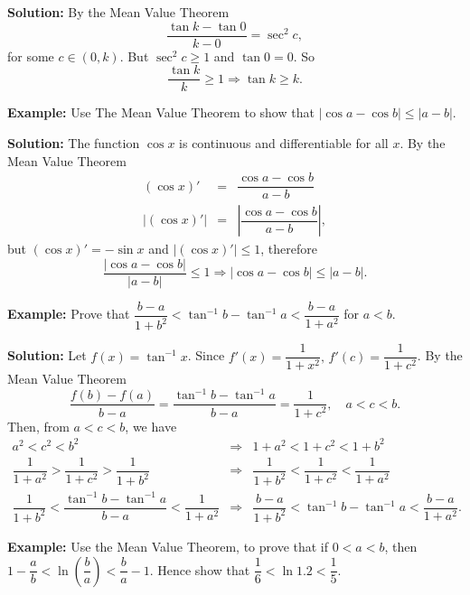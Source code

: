 \documentclass[titlepage,a4paper,12pt]{report}
\begin{document}
\noindent \textbf{Solution:} By the Mean Value Theorem
\begin{equation*}
\dfrac{\tan k -\tan 0}{k-0} =\sec ^2 c,
\end{equation*}
 for some $c\in (0,k)$. But $\sec ^2 c \geq 1$ and $\tan 0 =0$. So 
 \begin{equation*}
 \dfrac{\tan k}{k} \geq 1 \Longrightarrow \tan k \geq k.
 \end{equation*}
 
 \noindent \textbf{Example:} Use The Mean Value Theorem to show that $|\cos a -\cos b|\leq |a-b|$.
 
 \noindent \textbf{Solution:} The function $\cos x$ is continuous and differentiable for all $x$. By the Mean Value Theorem
 \begin{eqnarray*}
 (\cos x)' &=& \dfrac{\cos a -\cos b}{a-b}\\
 |(\cos x)'| &=& \left|\dfrac{\cos a -\cos b}{a-b} \right|,
 \end{eqnarray*}
 but $(\cos x)'=-\sin x$ and $|(\cos x)'|\leq 1$, therefore
 \begin{equation*}
 \dfrac{|\cos a -\cos b|}{|a-b|}\leq 1 \Longrightarrow |\cos a -\cos b|\leq |a-b|.
 \end{equation*}
 
 \noindent \textbf{Example:} Prove that $\dfrac{b-a}{1+b^2}<\tan ^{-1} b -\tan ^{-1} a < \dfrac{b-a}{1+a^2}$ for $a<b$.
 
 \noindent \textbf{Solution:} Let $f(x)=\tan ^{-1} x $. Since $f'(x)=\dfrac{1}{1+x^2}, \,f'(c)=\dfrac{1}{1+c^2} $. By the Mean Value Theorem
 \begin{equation*}
 \dfrac{f(b)-f(a)}{b-a}=\dfrac{\tan ^{-1} b-\tan ^{-1} a}{b-a} =\dfrac{1}{1+c^2}, \quad a<c<b.
 \end{equation*}
 Then, from $a<c<b$, we have 
 \begin{eqnarray*}
 a^2<c^2<b^2 &\Longrightarrow& 1+a^2<1+c^2<1+b^2\\
 \dfrac{1}{1+a^2}>\dfrac{1}{1+c^2}>\dfrac{1}{1+b^2} &\Longrightarrow &  \dfrac{1}{1+b^2}<\dfrac{1}{1+c^2}<\dfrac{1}{1+a^2}\\
 \dfrac{1}{1+b^2}<\dfrac{\tan ^{-1} b -\tan ^{-1} a}{b-a} <\dfrac{1}{1+a^2} &\Longrightarrow & \dfrac{b-a}{1+b^2}<\tan ^{-1} b -\tan ^{-1} a < \dfrac{b-a}{1+a^2}.
 \end{eqnarray*}
 
 \noindent \textbf{Example:} Use the Mean Value Theorem, to prove that if $0<a<b$, then $1-\dfrac{a}{b}<\ln \left(\dfrac{b}{a}\right)<\dfrac{b}{a}-1$. Hence show that $\dfrac{1}{6}<\ln 1.2 < \dfrac{1}{5}$.
 
\end{document}
